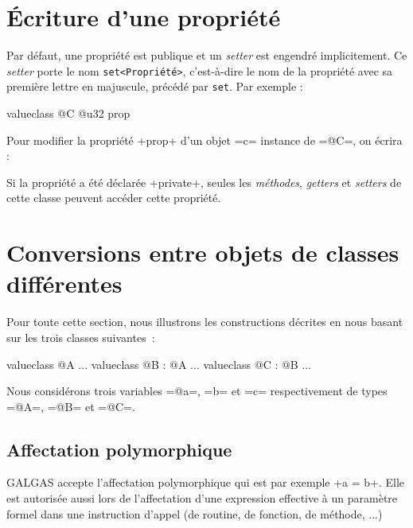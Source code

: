\section{Écriture d'une propriété}

Par défaut, une propriété est publique et un \emph{setter} est engendré implicitement. Ce \emph{setter} porte le nom \texttt{set<Propriété>}, c'est-à-dire le nom de la propriété avec sa première lettre en majuscule, précédé par \texttt{set}. Par exemple :

\begin{galgas4}
valueclass @C {
  @u32 prop
}
\end{galgas4}


Pour modifier la propriété \ggsq+prop+ d'un objet \ggsq=c= instance de \ggsq=@C=, on écrira :

\begin{galgas4}
[!?c setProp !12]
\end{galgas4}

Si la propriété a été déclarée \ggsq+private+, seules les \emph{méthodes}, \emph{getters} et \emph{setters} de cette classe peuvent accéder cette propriété.












\section{Conversions entre objets de classes différentes}

Pour toute cette section, nous illustrons les constructions décrites en nous basant sur les trois classes suivantes~:
\begin{galgas4}
valueclass @A {
  ...
}
valueclass @B : @A {
  ...
}
valueclass @C : @B {
  ...
}
\end{galgas4}

Nous considérons trois variables \ggsq=@a=, \ggsq=b= et \ggsq=c= respectivement de types \ggsq=@A=, \ggsq=@B= et \ggsq=@C=.


\subsection{Affectation polymorphique}

GALGAS accepte l'affectation polymorphique qui est par exemple \ggsq+a = b+. Elle est autorisée aussi lors de l'affectation d'une expression effective à un paramètre formel dans une instruction d'appel (de routine, de fonction, de méthode, ...)


